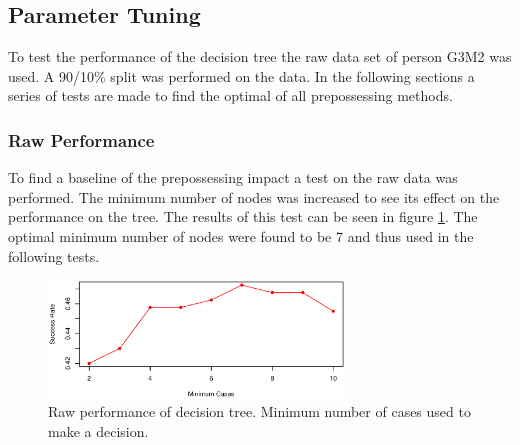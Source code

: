 \subsection{Parameter Tuning}

To test the performance of the decision tree the raw data set of person G3M2 was used.
A 90/10\% split was performed on the data.
In the following sections a series of tests are made to find the optimal of all prepossessing methods.

% 
% 
% 
% 
% 
% 

\subsubsection{Raw Performance}

To find a baseline of the prepossessing impact a test on the raw data was performed.
The minimum number of nodes was increased to see its effect on the performance on the tree.
The results of this test can be seen in figure \ref{fig:tree_raw}. 
The optimal minimum number of nodes were found to be 7 and thus used in the following tests.

\begin{figure}[H]
\centering
\includegraphics[width=0.7\textwidth]{graphics/tree_raw}
\caption{Raw performance of decision tree. Minimum number of cases used to make a decision. }%
\label{fig:tree_raw}
\end{figure}


